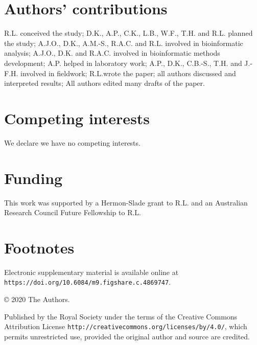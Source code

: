 \section{Authors' contributions}

R.L. conceived the study; D.K., A.P., C.K., L.B., W.F., T.H. and R.L. planned the study; A.J.O., D.K., A.M.-S., R.A.C. and R.L. involved in bioinformatic analysis; A.J.O., D.K. and R.A.C. involved in bioinformatic methods development; A.P. helped in laboratory work; A.P., D.K., C.B.-S., T.H. and J.-F.H. involved in fieldwork; R.L.wrote the paper; all authors discussed and interpreted results; All authors edited many drafts of the paper.

\section{Competing interests}

We declare we have no competing interests.

\section{Funding}

This work was supported by a Hermon-Slade grant to R.L. and an Australian Research Council Future Fellowship to R.L.

\section{Footnotes}

Electronic supplementary material is available online at \texttt{https://doi.org/10.6084/m9.figshare.c.4869747}.

© 2020 The Authors.

Published by the Royal Society under the terms of the Creative Commons Attribution License \texttt{http://creativecommons.org/licenses/by/4.0/}, which permits unrestricted use, provided the original author and source are credited.

\printbibliography{}
